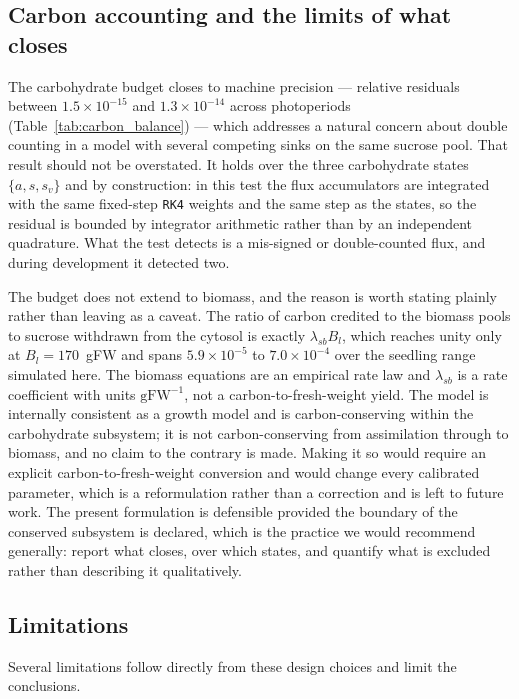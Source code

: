 \documentclass[a4paper,fleqn]{cas-sc}
\begin{document}
\subsection{Carbon accounting and the limits of what closes}
\label{sec:discussion_carbon}

The carbohydrate budget closes to machine precision --- relative residuals
between $1.5\times10^{-15}$ and $1.3\times10^{-14}$ across photoperiods
(Table~\ref{tab:carbon_balance}) --- which addresses a natural concern about
double counting in a model with several competing sinks on the same sucrose
pool. That result should not be overstated. It holds over the three
carbohydrate states $\{a,s,s_v\}$ and by construction: in this test the flux
accumulators are integrated with the same fixed-step \texttt{RK4} weights and
the same step as the states, so the residual is bounded by integrator
arithmetic rather than by an independent quadrature. What the test detects is a mis-signed or
double-counted flux, and during development it detected two.

The budget does not extend to biomass, and the reason is worth stating
plainly rather than leaving as a caveat. The ratio of carbon credited to the
biomass pools to sucrose withdrawn from the cytosol is exactly
$\lambda_{sb} B_l$, which reaches unity only at $B_l = 170$~gFW and spans
$5.9\times10^{-5}$ to $7.0\times10^{-4}$ over the seedling range simulated
here. The biomass equations are an empirical rate law and $\lambda_{sb}$ is a
rate coefficient with units $\mathrm{gFW^{-1}}$, not a carbon-to-fresh-weight
yield. The model is internally consistent as a growth model and is
carbon-conserving within the carbohydrate subsystem; it is not
carbon-conserving from assimilation through to biomass, and no claim to the
contrary is made. Making it so would require an explicit carbon-to-fresh-weight
conversion and would change every calibrated parameter, which is a
reformulation rather than a correction and is left to future work. The
present formulation is defensible provided the boundary of the conserved
subsystem is declared, which is the practice we would recommend generally:
report what closes, over which states, and quantify what is excluded rather
than describing it qualitatively.

\subsection{Limitations}
\label{sec:limitations}

Several limitations follow directly from these design choices and limit the conclusions.
\end{document}
